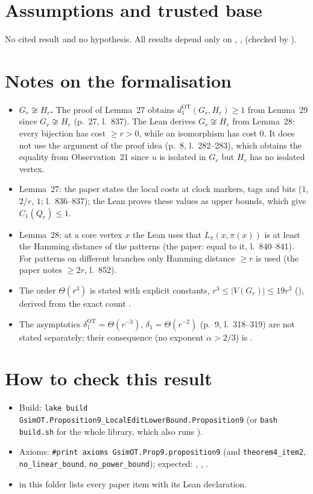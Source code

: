 \section{Assumptions and trusted base}
No cited result and no hypothesis. All results depend only on , ,
 (checked by ).

\section{Notes on the formalisation}
\begin{itemize}
\item \textbf{$G_r\not\cong H_r$.} The proof of Lemma~27 obtains $d_1^{\mathrm{OT}}(G_r,H_r)\ge1$ from Lemma~29
  since $G_r\not\cong H_r$ (p.~27, l.~837). The Lean derives $G_r\not\cong H_r$ from Lemma~28: every bijection
  has cost $\ge r>0$, while an isomorphism has cost $0$. It does not use the argument of the proof idea
  (p.~8, l.~282--283), which obtains the equality from Observation~21 since $u$ is isolated in $G_r$ but
  $H_r$ has no isolated vertex.
\item Lemma~27: the paper states the local costs at clock markers, tags and bits ($1$, $2/r$, $1$; l.~836--837);
  the Lean proves these values as upper bounds, which give $C_1(Q_r)\le1$.
\item Lemma~28: at a core vertex $x$ the Lean uses that $L_\pi(x,\pi(x))$ is at least the Hamming distance of
  the patterns (the paper: equal to it, l.~840--841). For patterns on different branches only Hamming
  distance $\ge r$ is used (the paper notes $\ge 2r$, l.~852).
\item The order $\Theta(r^3)$ is stated with explicit constants, $r^3\le|V(G_r)|\le19r^3$
  (), derived from the exact count .
\item The asymptotics $\delta_1^{\mathrm{OT}}=\Theta(r^{-3})$, $\delta_1=\Theta(r^{-2})$ (p.~9, l.~318--319) are
  not stated separately; their consequence (no exponent $\alpha>2/3$) is .
\end{itemize}

\section{How to check this result}
\begin{itemize}
\item Build: \texttt{lake build GsimOT.Proposition9\_LocalEditLowerBound.Proposition9} (or \texttt{bash build.sh}
  for the whole library, which also runs ).
\item Axioms: \texttt{\#print axioms GsimOT.Prop9.proposition9} (and \texttt{theorem4\_item2},
  \texttt{no\_linear\_bound}, \texttt{no\_power\_bound}); expected: , ,
  .
\item {} in this folder lists every paper item with its Lean declaration.
\end{itemize}

